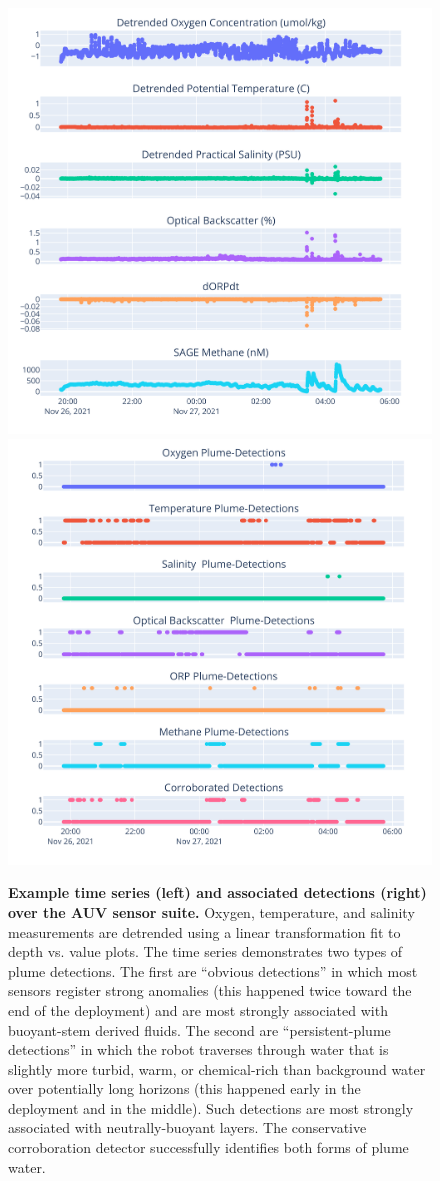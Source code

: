 \begin{figure}[h!]
    \centering
    \includegraphics[width=0.45\columnwidth]{figures/binary_example_time.png}
    \hspace{.1in}
    \includegraphics[width=0.45\columnwidth]{figures/binary_example_detections.png}
    \caption[Example time series (left) and associated detections (right) over the AUV \Sentry sensor suite.]{\textbf{Example time series (left) and associated detections (right) over the AUV \Sentry sensor suite.} Oxygen, temperature, and salinity measurements are detrended using a linear transformation fit to depth vs. value plots. The time series demonstrates two types of plume detections. The first are ``obvious detections'' in which most sensors register strong anomalies (this happened twice toward the end of the deployment) and are most strongly associated with buoyant-stem derived fluids. The second are ``persistent-plume detections'' in which the robot traverses through water that is slightly more turbid, warm, or chemical-rich than background water over potentially long horizons (this happened early in the deployment and in the middle). Such detections are most strongly associated with neutrally-buoyant layers. The conservative corroboration detector successfully identifies both forms of plume water.}
    \label{fig:detection_example}
\end{figure}

